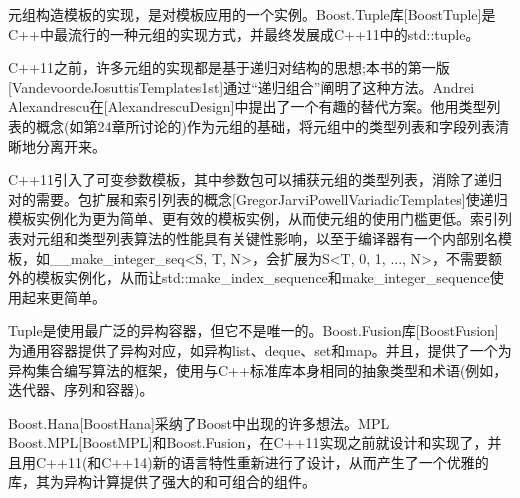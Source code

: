 
元组构造模板的实现，是对模板应用的一个实例。Boost.Tuple库[BoostTuple]是C++中最流行的一种元组的实现方式，并最终发展成C++11中的std::tuple。

C++11之前，许多元组的实现都是基于递归对结构的思想;本书的第一版[VandevoordeJosuttisTemplates1st]通过“递归组合”阐明了这种方法。Andrei Alexandrescu在[AlexandrescuDesign]中提出了一个有趣的替代方案。他用类型列表的概念(如第24章所讨论的)作为元组的基础，将元组中的类型列表和字段列表清晰地分离开来。

C++11引入了可变参数模板，其中参数包可以捕获元组的类型列表，消除了递归对的需要。包扩展和索引列表的概念[GregorJarviPowellVariadicTemplates]使递归模板实例化为更为简单、更有效的模板实例，从而使元组的使用门槛更低。索引列表对元组和类型列表算法的性能具有关键性影响，以至于编译器有一个内部别名模板，如\_\_make\_integer\_seq<S, T, N>，会扩展为S<T, 0, 1, ..., N>，不需要额外的模板实例化，从而让std::make\_index\_sequence和make\_integer\_sequence使用起来更简单。

Tuple是使用最广泛的异构容器，但它不是唯一的。Boost.Fusion库[BoostFusion]为通用容器提供了异构对应，如异构list、deque、set和map。并且，提供了一个为异构集合编写算法的框架，使用与C++标准库本身相同的抽象类型和术语(例如，迭代器、序列和容器)。

Boost.Hana[BoostHana]采纳了Boost中出现的许多想法。MPL Boost.MPL[BoostMPL]和Boost.Fusion，在C++11实现之前就设计和实现了，并且用C++11(和C++14)新的语言特性重新进行了设计，从而产生了一个优雅的库，其为异构计算提供了强大的和可组合的组件。